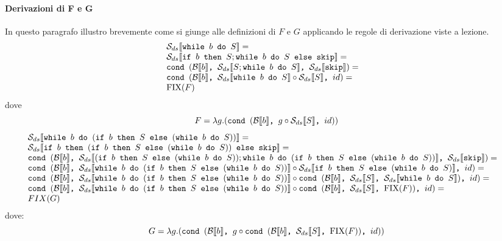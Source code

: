 {\paragraph{Derivazioni di F e G}
In questo paragrafo illustro brevemente come si giunge alle definizioni di $F$ e $G$ applicando 
le regole di derivazione viste a lezione.
$$
\begin{array}{ll}
\dsCtxt{\wbS{b}{S}} = & \\
\dsCtxt{\ifABC{b}{S; \wbS{b}{S}}{\skipForFriends}} = & \\
\cond{b}{\dsCtxt{S; \wbS{b}{S}}}{\dsCtxt{\skipForFriends}} = & \\
\cond{b}{\dsCtxt{\wbS{b}{S}} \circ \dsCtxt{S}}{id} = & \\
\fixp{F}
\end{array}
$$
dove 
$$
F = \lambda g. (\cond{b}{g \circ \dsCtxt{S}}{id})
$$
$$
\begin{array}{ll}
\dsCtxt{\wbS{b}{(\ifABC{b}{S}{(\wbS{b}{S})})}} = & \\
\dsCtxt{\ifABC{b}{(\ifABC{b}{S}{(\wbS{b}{S})})}{\skipForFriends}} = & \\
\cond
{b}
{\dsCtxt{(\ifABC{b}{S}{(\wbS{b}{S})}); \wbS{b}{(\ifABC{b}{S}{(\wbS{b}{S})})}}}
{\dsCtxt{\skipForFriends}}
= & \\
\cond{b}
{\dsCtxt{\wbS{b}{(\ifABC{b}{S}{(\wbS{b}{S})})}} \circ
	\dsCtxt{\ifABC{b}{S}{(\wbS{b}{S})}}}{id} = & \\
\cond{b}
{
	\dsCtxt{\wbS{b}{(\ifABC{b}{S}{(\wbS{b}{S})})}} \circ
	\cond{b}{\dsCtxt{S}}{\dsCtxt{\wbS{b}{S}}}
}{id} =  & \\
\cond{b}
{
	\dsCtxt{\wbS{b}{(\ifABC{b}{S}{(\wbS{b}{S})})}} \circ
	\cond{b}{\dsCtxt{S}}{\fixp{F}}
}{id} = & \\
FIX(G)
\end{array}
$$
dove:
$$
G = \lambda g .(\cond{b}{g \circ \cond{b}{\dsCtxt{S}}{\fixp{F}}}{id})
$$
}

